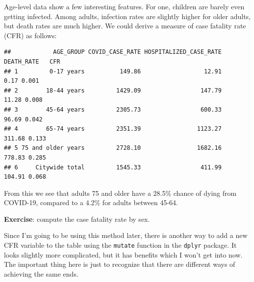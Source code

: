 \documentclass[openany]{book}
\newenvironment{Shaded}{\begin{snugshade}}{\end{snugshade}}
\newcommand{\CommentTok}[1]{\textcolor[rgb]{0.56,0.35,0.01}{\textit{#1}}}
\newcommand{\DataTypeTok}[1]{\textcolor[rgb]{0.13,0.29,0.53}{#1}}
\newcommand{\DecValTok}[1]{\textcolor[rgb]{0.00,0.00,0.81}{#1}}
\newcommand{\KeywordTok}[1]{\textcolor[rgb]{0.13,0.29,0.53}{\textbf{#1}}}
\newcommand{\NormalTok}[1]{#1}
\newcommand{\OperatorTok}[1]{\textcolor[rgb]{0.81,0.36,0.00}{\textbf{#1}}}
\newcommand{\StringTok}[1]{\textcolor[rgb]{0.31,0.60,0.02}{#1}}
\begin{document}
Age-level data show a few interesting features. For one, children are barely even getting infected. Among adults, infection rates are slightly higher for older adults, but death rates are much higher. We could derive a measure of case fatality rate (CFR) as follows:

\begin{Shaded}
\end{Shaded}

\begin{verbatim}
##            AGE_GROUP COVID_CASE_RATE HOSPITALIZED_CASE_RATE DEATH_RATE   CFR
## 1         0-17 years          149.86                  12.91       0.17 0.001
## 2        18-44 years         1429.09                 147.79      11.28 0.008
## 3        45-64 years         2305.73                 600.33      96.69 0.042
## 4        65-74 years         2351.39                1123.27     311.68 0.133
## 5 75 and older years         2728.10                1682.16     778.83 0.285
## 6     Citywide total         1545.33                 411.99     104.91 0.068
\end{verbatim}

From this we see that adults 75 and older have a 28.5\% chance of dying from COVID-19, compared to a 4.2\% for adults between 45-64.

\textbf{Exercise}: compute the case fatality rate by sex.

Since I'm going to be using this method later, there is another way to add a new CFR variable to the table using the \texttt{mutate} function in the \texttt{dplyr} package. It looks slightly more complicated, but it has benefits which I won't get into now. The important thing here is just to recognize that there are different ways of achieving the same ends.

\begin{Shaded}
\end{Shaded}
\end{document}
